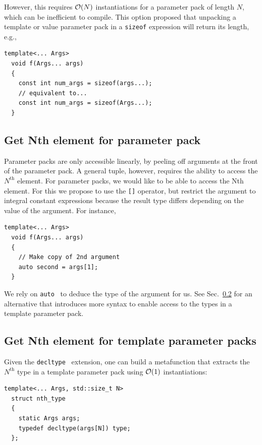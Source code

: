 \documentclass{article}
\begin{document}
However, this requires ${\cal O}(N)$ instantiations for a parameter
pack of length $N$, which can be inefficient to compile. This option
proposed that unpacking a template or value parameter pack in a
\texttt{sizeof} expression will return its length, e.g.,

\begin{verbatim}
template<... Args>
  void f(Args... args)
  {
    const int num_args = sizeof(args...);
    // equivalent to...
    const int num_args = sizeof(Args...);
  }
\end{verbatim}

\subsection{Get Nth element for parameter pack}
Parameter packs are only accessible linearly, by peeling off arguments
at the front of the parameter pack. A general tuple, however, requires
the ability to access the $N^{\text{th}}$ element. For parameter
packs, we would like to be able to access the Nth element. For this we
propose to use the \texttt{[]} operator, but restrict the argument to
integral constant expressions because the result type differs
depending on the value of the argument. For instance,

\begin{verbatim}
template<... Args>
  void f(Args... args)
  {
    // Make copy of 2nd argument
    auto second = args[1];
  }
\end{verbatim}

We rely on \texttt{auto}~\cite{JarviStroustrup04} to deduce the type
of the argument for us. See Sec.~\ref{sec:nth-element-template} for an
alternative that introduces more syntax to enable access to the types
in a template parameter pack.

\subsection{Get Nth element for template parameter packs}
\label{sec:nth-element-template}
Given the \texttt{decltype}~\cite{JarviStroustrup04} extension, one
can build a metafunction that extracts the $N^{\text{th}}$ type in a
template parameter pack using ${\cal O}(1)$ instantiations:

\begin{verbatim}
template<... Args, std::size_t N>
  struct nth_type
  {
    static Args args;
    typedef decltype(args[N]) type;
  };
\end{verbatim}
\end{document}
